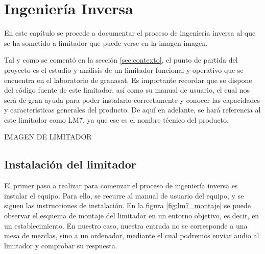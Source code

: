 \chapter{Ingeniería Inversa} \label{cap:capitulo3}

En este capítulo se procede a documentar el proceso de ingeniería inversa al que se ha sometido a limitador que puede verse en la imagen {imagen}.

Tal y como se comentó en la sección \ref{sec:contexto}, el punto de partida del proyecto es el estudio y análisis de un limitador funcional y operativo que se encuentra en el laboratorio de \gls{granasat}. Es importante recordar que se dispone del código fuente de este limitador, así como su manual de usuario, el cual nos será de gran ayuda para poder instalarlo correctamente y conocer las capacidades y características generales del producto. De aquí en adelante, se hará referencia al este limitador como \acrshort{LM7}, ya que ese es el nombre técnico del producto.

IMAGEN DE LIMITADOR

\section{Instalación del limitador}

El primer paso a realizar para comenzar el proceso de ingeniería inversa es instalar el equipo. Para ello, se recurre al manual de usuario del equipo, y se siguen las instrucciones de instalación. En la figura \ref{fig:lm7_montaje} se puede observar el esquema de montaje del limitador en un entorno objetivo, es decir, en un establecimiento. En nuestro caso, nuestra entrada no se corresponde a una mesa de mezclas, sino a un ordenador, mediante el cual podremos enviar audio al limitador y comprobar su respuesta.


